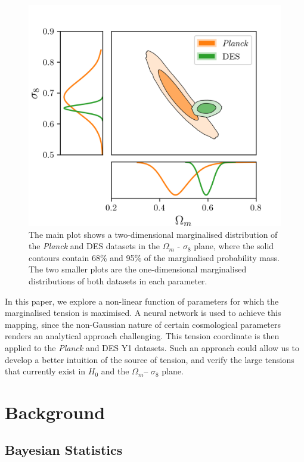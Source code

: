 \documentclass[%
 reprint,
 amsmath,amssymb,
 aps,
]{revtex4-2}
\begin{document}
\begin{figure}
    \includegraphics[width=0.9\columnwidth]{../plots/omegam_sigma8.png}
    \centering
    \caption{The main plot shows a two-dimensional marginalised distribution of the \textit{Planck} and DES datasets in the $\Omega_m$ - $\sigma_8$ plane, where the solid contours contain 68\% and 95\% of the marginalised probability mass. The two smaller plots are the one-dimensional marginalised distributions of both datasets in each   parameter.}
    \label{omegam_sigma8}
\end{figure}

In this paper, we explore a non-linear function of parameters for which the marginalised tension is maximised. A neural network is used to achieve this mapping, since the non-Gaussian nature of certain cosmological parameters renders an analytical approach challenging. This tension coordinate is then applied to the \textit{Planck} and DES Y1 datasets. Such an approach could allow us to develop a better intuition of the source of tension, and verify the large tensions that currently exist in $H_0$ and the $\Omega_m$-- $\sigma_8$ plane.



\section{Background}

\subsection{Bayesian Statistics}
\end{document}
